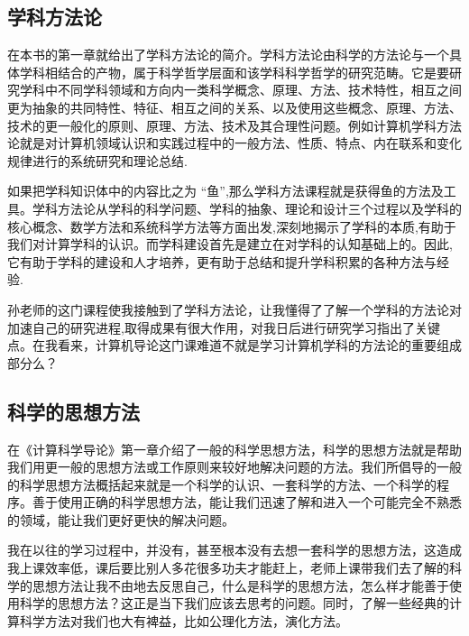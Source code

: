 \documentclass{article}
\begin{document}
\subsection{学科方法论}
在本书的第一章就给出了学科方法论的简介。学科方法论由科学的方法论与一个具体学科相结合的产物，属于科学哲学层面和该学科科学哲学的研究范畴。它是要研究学科中不同学科领域和方向内一类科学概念、原理、方法、技术特性，相互之间更为抽象的共同特性、特征、相互之间的关系、以及使用这些概念、原理、方法、技术的更一般化的原则、原理、方法、技术及其合理性问题。例如计算机学科方法论就是对计算机领域认识和实践过程中的一般方法、性质、特点、内在联系和变化规律进行的系统研究和理论总结.\par
如果把学科知识体中的内容比之为 “鱼”,那么学科方法课程就是获得鱼的方法及工具。学科方法论从学科的科学问题、学科的抽象、理论和设计三个过程以及学科的核心概念、数学方法和系统科学方法等方面出发,深刻地揭示了学科的本质,有助于我们对计算学科的认识。而学科建设首先是建立在对学科的认知基础上的。因此,它有助于学科的建设和人才培养，更有助于总结和提升学科积累的各种方法与经验.\citep{ll}\par
孙老师的这门课程使我接触到了学科方法论，让我懂得了了解一个学科的方法论对加速自己的研究进程,取得成果有很大作用，对我日后进行研究学习指出了关键点。在我看来，计算机导论这门课难道不就是学习计算机学科的方法论的重要组成部分么？\par

\subsection{科学的思想方法}
在《计算科学导论》第一章介绍了一般的科学思想方法，科学的思想方法就是帮助我们用更一般的思想方法或工作原则来较好地解决问题的方法。我们所倡导的一般的科学思想方法概括起来就是一个科学的认识、一套科学的方法、一个科学的程序。善于使用正确的科学思想方法，能让我们迅速了解和进入一个可能完全不熟悉的领域，能让我们更好更快的解决问题。\par
我在以往的学习过程中，并没有，甚至根本没有去想一套科学的思想方法，这造成我上课效率低，课后要比别人多花很多功夫才能赶上，老师上课带我们去了解的科学的思想方法让我不由地去反思自己，什么是科学的思想方法，怎么样才能善于使用科学的思想方法？这正是当下我们应该去思考的问题。同时，了解一些经典的计算科学方法对我们也大有裨益，比如公理化方法，演化方法。
\par
\end{document}
